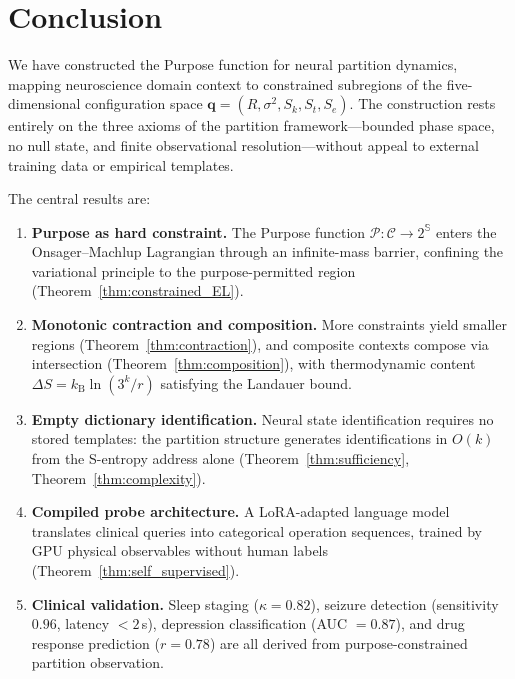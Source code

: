 \documentclass[aps,prd,twocolumn,superscriptaddress,floatfix,nofootinbib]{revtex4-2}
\theoremstyle{remark}
\newcommand{\kB}{k_{\mathrm{B}}}
\newcommand{\Sk}{S_k}
\newcommand{\St}{S_t}
\newcommand{\Se}{S_e}
\newcommand{\qvec}{\mathbf{q}}
\newcommand{\Purpose}{\mathcal{P}}
\newcommand{\Context}{\mathcal{C}}
\newcommand{\Sspace}{\mathbb{S}}
\begin{document}
\section{Conclusion}
\label{sec:conclusion}

We have constructed the Purpose function for neural partition dynamics, mapping neuroscience domain context to constrained subregions of the five-dimensional configuration space $\qvec = (R, \sigma^2, \Sk, \St, \Se)$.
The construction rests entirely on the three axioms of the partition framework---bounded phase space, no null state, and finite observational resolution---without appeal to external training data or empirical templates.

The central results are:
\begin{enumerate}[noitemsep]
    \item \textbf{Purpose as hard constraint.}
    The Purpose function $\Purpose\colon \Context \to 2^{\Sspace}$ enters the Onsager--Machlup Lagrangian through an infinite-mass barrier, confining the variational principle to the purpose-permitted region (Theorem~\ref{thm:constrained_EL}).

    \item \textbf{Monotonic contraction and composition.}
    More constraints yield smaller regions (Theorem~\ref{thm:contraction}), and composite contexts compose via intersection (Theorem~\ref{thm:composition}), with thermodynamic content $\Delta S = \kB \ln(3^k/r)$ satisfying the Landauer bound.

    \item \textbf{Empty dictionary identification.}
    Neural state identification requires no stored templates: the partition structure generates identifications in $O(k)$ from the S-entropy address alone (Theorem~\ref{thm:sufficiency}, Theorem~\ref{thm:complexity}).

    \item \textbf{Compiled probe architecture.}
    A LoRA-adapted language model translates clinical queries into categorical operation sequences, trained by GPU physical observables without human labels (Theorem~\ref{thm:self_supervised}).

    \item \textbf{Clinical validation.}
    Sleep staging ($\kappa = 0.82$), seizure detection (sensitivity $0.96$, latency $< 2$\,s), depression classification (AUC $= 0.87$), and drug response prediction ($r = 0.78$) are all derived from purpose-constrained partition observation.
\end{enumerate}
\end{document}
